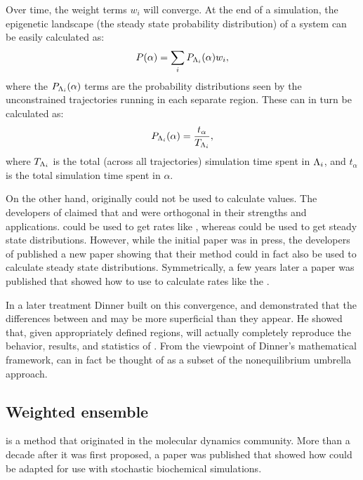 Over time, the weight terms $w_i$ will converge\supercite{Dickson:2010gf}. At the end of a  simulation, the epigenetic landscape (\ie the steady state probability distribution) of a system can be easily calculated as:
\begin{equation*}
    P(\alpha) = \sum_{i} P_{\Lambda_{i}} (\alpha) w_i,
\end{equation*}
where the $P_{\Lambda_{i}} (\alpha)$ terms are the probability distributions seen by the unconstrained trajectories running in each separate region. These can in turn be calculated as:
\begin{equation*}
    P_{\Lambda_{i}} (\alpha) = \frac{t_{\alpha}}{T_{\Lambda_{i}}},
\end{equation*}
where $T_{\Lambda_{i}}$ is the total (across all trajectories) simulation time spent in $\Lambda_{i}$, and $t_{\alpha}$ is the total simulation time spent in $\alpha$.

On the other hand,  originally could not be used to calculate  values. The developers of  claimed that  and  were orthogonal in their strengths and applications.  could be used to get rates like , whereas  could be used to get steady state distributions. However, while the initial  paper was in press, the developers of  published a new paper showing that their method could in fact also be used to calculate steady state distributions\supercite{Valeriani:2007hv}. Symmetrically, a few years later a paper was published that showed how to use  to calculate rates\supercite{Dickson:2009fua} like the .


In a later treatment\supercite{Dickson:2010gf} Dinner built on this convergence, and demonstrated that the differences between  and  may be more superficial than they appear. He showed that, given appropriately defined regions,  will actually completely reproduce the behavior, results, and statistics of . From the viewpoint of Dinner's mathematical framework,  can in fact be thought of as a subset of the nonequilibrium umbrella approach.

\subsection{Weighted ensemble}
 is a method that originated\supercite{Huber:1996dn} in the molecular dynamics community. More than a decade after it was first proposed, a paper\supercite{Bhatt:2010df} was published that showed how  could be adapted for use with stochastic biochemical simulations.
\supercite{Donovan:2013gz,Donovan:2016bi,Zuckerman:2017eq}

